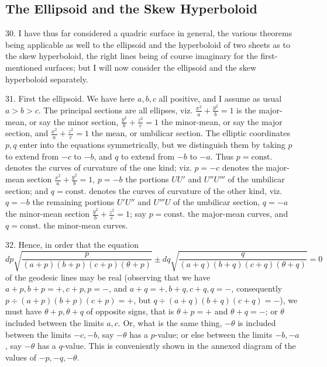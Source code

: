 \documentclass[11pt,a4paper]{article}
\begin{document}
\subsection*{The Ellipsoid and the Skew Hyperboloid}

30. I have thus far considered a quadric surface in general, the various theorems being
applicable as well to the ellipsoid and the hyperboloid of two sheets as to the skew
hyperboloid, the right lines being of course imaginary for the first-mentioned surfaces;
but I will now consider the ellipsoid and the skew hyperboloid separately.

31. First the ellipsoid. We have here $a,b,c$ all positive, and I assume as usual $a>b>c$.
The principal sections are all ellipses, viz. $\frac{x^2}{a}+\frac{y^2}{b}=1$ is the
major-mean, or say the minor section, $\frac{y^2}{b}+\frac{z^2}{c}=1$ the minor-mean,
or say the major section, and $\frac{x^2}{a}+\frac{z^2}{c}=1$ the mean, or umbilicar
section. The elliptic coordinates $p,q$ enter into the equations symmetrically, but we
distinguish them by taking $p$ to extend from $-c$ to $-b$, and $q$ to extend from $-b$ to
$-a$. Thus $p=\mathrm{const.}$ denotes the curves of curvature of the one kind; viz.
$p=-c$ denotes the major-mean section $\frac{x^2}{a}+\frac{y^2}{b}=1$, $p=-b$ the portions
$UU'$ and $U''U'''$ of the umbilicar section; and $q=\mathrm{const.}$ denotes the curves
of curvature of the other kind, viz. $q=-b$ the remaining portions $U'U''$ and $U'''U$ of
the umbilicar section, $q=-a$ the minor-mean section $\frac{y^2}{b}+\frac{z^2}{c}=1$;
say $p=\mathrm{const.}$ the major-mean curves, and $q=\mathrm{const.}$ the minor-mean curves.

\begin{center}
\end{center}

32. Hence, in order that the equation
\[
 dp\sqrt{\frac{p}{(a+p)(b+p)(c+p)(\theta+p)}}
 \pm dq\sqrt{\frac{q}{(a+q)(b+q)(c+q)(\theta+q)}}=0
\]
of the geodesic lines may be real (observing that we have
$a+p,b+p=+,c+p,p=-$, and $a+q=+,b+q,c+q,q=-$, consequently
$p\div(a+p)(b+p)(c+p)=+$, but $q\div(a+q)(b+q)(c+q)=-$), we must have
$\theta+p,\theta+q$ of opposite signs, that is $\theta+p=+$ and $\theta+q=-$; or $\theta$
included between the limits $a,c$. Or, what is the same thing, $-\theta$ is included between
the limits $-c,-b$, say $-\theta$ has a $p$-value; or else between the limits $-b,-a$,
say $-\theta$ has a $q$-value. This is conveniently shown in the annexed diagram of the
values of $-p,-q,-\theta$.
\end{document}
